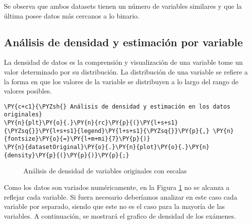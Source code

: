    Se observa que ambos datasets tienen un número de variables similares y que la última posee datos más cercanos a lo binario.

    \hypertarget{anuxe1lisis-de-densidad-y-estimaciuxf3n-por-variable}{%
\subsection{Análisis de densidad y estimación por variable}\label{anuxe1lisis-de-densidad-y-estimaciuxf3n-por-variable}}

La densidad de datos es la comprensión y visualización de una variable tome un valor determinado por su distribución.  La distribución de una variable se refiere a la forma en que los valores de la variable se distribuyen a lo largo del rango de valores posibles.

    \begin{tcolorbox}[breakable, size=fbox, boxrule=1pt, pad at break*=1mm,colback=cellbackground, colframe=cellborder]
\begin{Verbatim}[commandchars=\\\{\}]
\PY{c+c1}{\PYZsh{} Análisis de densidad y estimación en los datos originales}
\PY{n}{plt}\PY{o}{.}\PY{n}{rc}\PY{p}{(}\PY{l+s+s1}{\PYZsq{}}\PY{l+s+s1}{legend}\PY{l+s+s1}{\PYZsq{}}\PY{p}{,} \PY{n}{fontsize}\PY{o}{=}\PY{l+m+mi}{7}\PY{p}{)}
\PY{n}{datasetOriginal}\PY{o}{.}\PY{n}{plot}\PY{o}{.}\PY{n}{density}\PY{p}{(}\PY{p}{)}\PY{p}{;}
\end{Verbatim}
\end{tcolorbox}

\begin{center}
    	\begin{figure}[H]
	\centering
	\caption{Análisis de densidad de variables originales con escalas}
	\label{fig:advoe}
	\end{figure}
\end{center}
    
    Como los datos son variados numéricamente, en la Figura \ref{fig:advoe} no se alcanza a reflejar cada variable. Si fuera necesario deberíamos analizar en este caso cada variable por separado, siendo que este no es el caso para la mayoría de las variables. A continuación, se mostrará el grafico de densidad de los exámenes.

